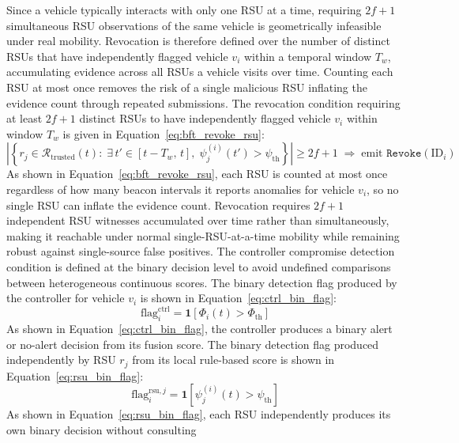 \documentclass[12pt, a4paper]{report}
\begin{document}
Since a vehicle typically interacts with only one RSU at a time,
requiring $2f+1$ simultaneous RSU observations of the same vehicle
is geometrically infeasible under real mobility. Revocation is
therefore defined over the number of distinct RSUs that
have independently flagged vehicle $v_i$ within a temporal window
$T_w$, accumulating evidence across all RSUs a vehicle visits
over time. Counting each RSU at most once removes the risk of a
single malicious RSU inflating the evidence count through
repeated submissions. The revocation condition requiring at least
$2f+1$ distinct RSUs to have independently flagged vehicle $v_i$
within window $T_w$ is given in Equation~\ref{eq:bft_revoke_rsu}:
\begin{equation}
    \left|\left\{r_j \in \mathcal{R}_{\mathrm{trusted}}(t) :\;
    \exists\, t' \in [t - T_w,\, t],\;
    \psi_j^{(i)}(t') > \psi_{\mathrm{th}}\right\}\right|
  \geq 2f + 1
  \;\Longrightarrow\;
  \text{emit } \texttt{Revoke}(\mathrm{ID}_i)
  \label{eq:bft_revoke_rsu}
\end{equation}
As shown in Equation~\ref{eq:bft_revoke_rsu}, each RSU is counted
at most once regardless of how many beacon intervals it reports
anomalies for vehicle $v_i$, so no single RSU can inflate the
evidence count. Revocation requires $2f+1$ independent RSU
witnesses accumulated over time rather than simultaneously,
making it reachable under normal single-RSU-at-a-time mobility
while remaining robust against single-source false positives. The controller compromise detection condition is defined at the
binary decision level to avoid undefined comparisons between
heterogeneous continuous scores. The binary detection flag
produced by the controller for vehicle $v_i$ is shown in
Equation~\eqref{eq:ctrl_bin_flag}:
\begin{equation}
  \mathrm{flag}_i^{\mathrm{ctrl}} =
    \mathbf{1}\!\left[\Phi_i(t) > \Phi_{\mathrm{th}}\right]
  \label{eq:ctrl_bin_flag}
\end{equation}
As shown in Equation~\eqref{eq:ctrl_bin_flag}, the controller
produces a binary alert or no-alert decision from its fusion
score. The binary detection flag produced independently by RSU
$r_j$ from its local rule-based score is shown in
Equation~\eqref{eq:rsu_bin_flag}:
\begin{equation}
  \mathrm{flag}_i^{\mathrm{rsu},j} =
    \mathbf{1}\!\left[\psi_j^{(i)}(t) > \psi_{\mathrm{th}}\right]
  \label{eq:rsu_bin_flag}
\end{equation}
As shown in Equation~\eqref{eq:rsu_bin_flag}, each RSU
independently produces its own binary decision without consulting
\end{document}
